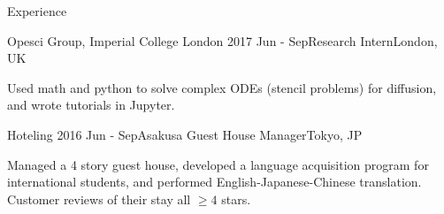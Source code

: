 \documentclass[10pt]{resume} %
\begin{document}
\begin{rSection}{Experience}

  \begin{rSubsection}{Opesci Group, Imperial College London}
    {2017 Jun - Sep}{Research Intern}{London, UK}
  \item Used math and python to solve complex ODEs (stencil problems) for
    diffusion, and wrote tutorials in Jupyter.
  \end{rSubsection}


  \begin{rSubsection}{Hoteling}
    {2016 Jun - Sep}{Asakusa Guest House Manager}{Tokyo, JP}
      \item Managed a 4 story guest house, developed a language acquisition
      program for international students, and performed English-Japanese-Chinese
      translation. Customer reviews of their stay all $\ge 4$ stars.
  \end{rSubsection}


\end{rSection}

\end{document}
